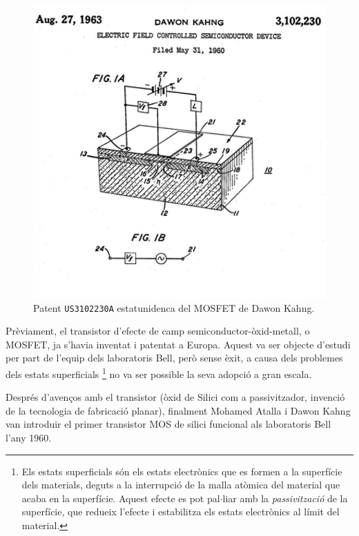 \documentclass[11pt,a4paper]{article}
\begin{document}
\begin{figure}
    \centering
    \includegraphics[width=\linewidth]{images/patent kahang.jpg}
    \caption{Patent \texttt{US3102230A} estatunidenca del MOSFET de Dawon Kahng.}
    \vspace{-1.4cm}
\end{figure}
Prèviament, el transistor d'efecte de camp semiconductor-òxid-metall, o MOSFET, ja s'havia inventat i patentat a Europa. Aquest va ser objecte d'estudi per part de l'equip dels laboratoris Bell, però sense èxit, a causa dels problemes dels estats superficials \footnote{Els estats superficials són els estats electrònics que es formen a la superfície dels materials, deguts a la interrupció de la malla atòmica del material que acaba en la superfície. Aquest efecte es pot pal$\cdot$liar amb la \textit{passivització} de la superfície, que redueix l'efecte i estabilitza els estats electrònics al límit del material.} no va ser possible la seva adopció a gran escala.

Després d'avenços amb el transistor (òxid de Silici com a passivitzador, invenció de la tecnologia de fabricació planar), finalment Mohamed Atalla i Dawon Kahng van introduir el primer transistor MOS de silici funcional als laboratoris Bell l'any 1960. 
\end{document}
